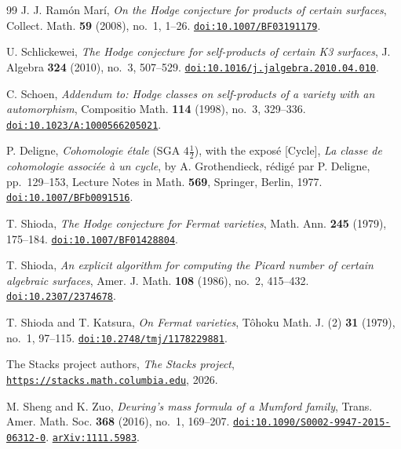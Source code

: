 \documentclass[11pt,reqno]{amsart}
\theoremstyle{plain}
\theoremstyle{definition}
\theoremstyle{remark}
\begin{document}
\begin{thebibliography}{99}
J. J. Ram\'on Mar\'i,
\emph{On the Hodge conjecture for products of certain surfaces},
Collect. Math. \textbf{59} (2008), no.~1, 1--26.
\href{https://doi.org/10.1007/BF03191179}{\texttt{doi:10.1007/BF03191179}}.

U. Schlickewei,
\emph{The Hodge conjecture for self-products of certain K3 surfaces},
J. Algebra \textbf{324} (2010), no.~3, 507--529.
\href{https://doi.org/10.1016/j.jalgebra.2010.04.010}{\texttt{doi:10.1016/j.jalgebra.2010.04.010}}.

C. Schoen,
\emph{Addendum to: Hodge classes on self-products of a variety with an
automorphism},
Compositio Math. \textbf{114} (1998), no.~3, 329--336.
\href{https://doi.org/10.1023/A:1000566205021}{\texttt{doi:10.1023/A:1000566205021}}.

P. Deligne,
\emph{Cohomologie \'etale} (SGA $4\frac{1}{2}$), with the expos\'e
[Cycle], \emph{La classe de cohomologie associ\'ee \`a un cycle}, by
A. Grothendieck, r\'edig\'e par P. Deligne, pp.~129--153,
Lecture Notes in Math. \textbf{569}, Springer, Berlin, 1977.
\href{https://doi.org/10.1007/BFb0091516}{\texttt{doi:10.1007/BFb0091516}}.

T. Shioda,
\emph{The Hodge conjecture for Fermat varieties},
Math. Ann. \textbf{245} (1979), 175--184.
\href{https://doi.org/10.1007/BF01428804}{\texttt{doi:10.1007/BF01428804}}.

T. Shioda,
\emph{An explicit algorithm for computing the Picard number of certain
algebraic surfaces},
Amer. J. Math. \textbf{108} (1986), no.~2, 415--432.
\href{https://doi.org/10.2307/2374678}{\texttt{doi:10.2307/2374678}}.

T. Shioda and T. Katsura,
\emph{On Fermat varieties},
T\^ohoku Math. J. (2) \textbf{31} (1979), no.~1, 97--115.
\href{https://doi.org/10.2748/tmj/1178229881}{\texttt{doi:10.2748/tmj/1178229881}}.

The Stacks project authors,
\emph{The Stacks project},
\href{https://stacks.math.columbia.edu}{\texttt{https://stacks.math.columbia.edu}},
2026.

M. Sheng and K. Zuo,
\emph{Deuring's mass formula of a Mumford family},
Trans. Amer. Math. Soc. \textbf{368} (2016), no.~1, 169--207.
\href{https://doi.org/10.1090/S0002-9947-2015-06312-0}%
{\texttt{doi:10.1090/S0002-9947-2015-06312-0}}.
\href{https://arxiv.org/abs/1111.5983}{\texttt{arXiv:1111.5983}}.


\end{thebibliography}
\end{document}
